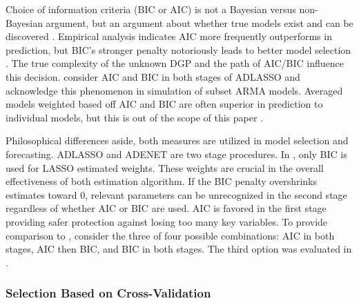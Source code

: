 Choice of information criteria (BIC or AIC) is not a Bayesian versus non-Bayesian argument, but an argument about whether true models exist and can be discovered \citep{burnham2003}. Empirical analysis indicates AIC more frequently outperforms in prediction, but BIC's stronger penalty notoriously leads to better model selection \citep{Burnham2004}. The true complexity of the unknown DGP and the path of AIC/BIC influence this decision\citep{Shao1997,burnham2003}. \cite{Chen2011} consider AIC and BIC in both stages of ADLASSO and acknowledge this phenomenon in simulation of subset ARMA models.  Averaged models weighted based off AIC and BIC are often superior in prediction to individual models, but this is out of the scope of this paper \citep{Burnham2004}. 

Philosophical differences aside, both measures are utilized in model selection and forecasting. ADLASSO and ADENET are two stage procedures. In \cite{Chen2011}, only BIC is used for LASSO estimated weights. These weights are crucial in the overall effectiveness of both estimation algorithm. If the BIC penalty overshrinks estimates toward $0$, relevant parameters can be unrecognized in the second stage regardless of whether AIC or BIC are used. AIC is favored in the first stage providing safer protection against losing too many key variables. To provide comparison to \cite{Chen2011}, consider the three of four possible combinations: AIC in both stages, AIC then BIC, and BIC in both stages. The third option was evaluated in \cite{Chen2011}.

\subsubsection{Selection Based on Cross-Validation}

